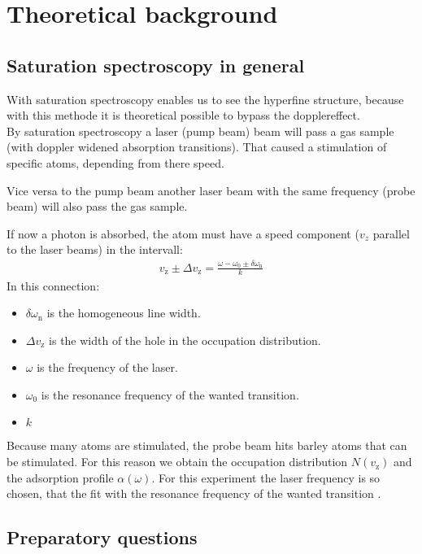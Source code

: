 \chapter{Theoretical background}

\section{Saturation spectroscopy in general}
With saturation spectroscopy enables us to see the hyperfine structure, because with this methode it is theoretical possible to bypass the dopplereffect. \\
By saturation spectroscopy a laser (pump beam) beam will pass a gas sample (with doppler widened absorption transitions). That caused a stimulation of specific atoms, depending from there speed. 

Vice versa to the pump beam another laser beam with the same frequency (probe beam) will also pass the gas sample.

If now a photon is absorbed, the atom must have a speed component ($v_z$ parallel to the laser beams) in the intervall: 
\begin{align}
    v_{\text{z}} \pm \Delta v_{\text{z}} = \frac{\omega -\omega_0 \pm \delta \omega_{\text{n}}}{k}
\end{align}
In this connection: 
\begin{itemize} 
    \item $\delta \omega_{\text{n}}$ is the homogeneous line width.
    \item $\Delta v_{\text{z}}$ is the width of the hole in the occupation distribution.
    \item $\omega$ is the frequency of the laser.
    \item $\omega_0$ is the resonance frequency of the wanted transition.
    \item $k$ 
\end{itemize}

Because many atoms are stimulated, the probe beam hits barley atoms that can be stimulated. For this reason we obtain the occupation distribution $N(v_{\text{z}})$ and the adsorption profile $\alpha(\omega)$. For this experiment the laser frequency is so chosen, that the fit with the resonance frequency of the wanted transition \citep{VA}.

\section{Preparatory questions}

